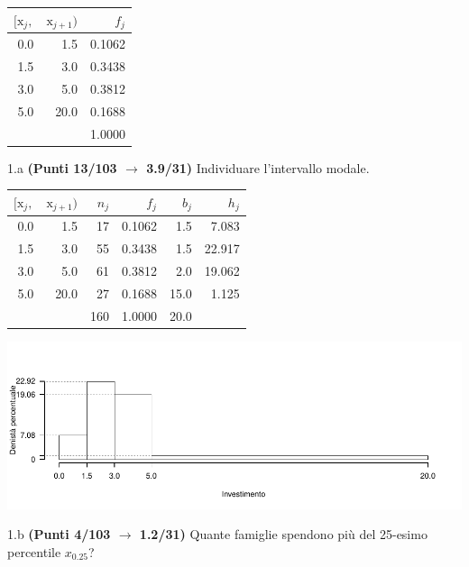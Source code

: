 \documentclass[
  11pt,
]{book}
\theoremstyle{mytheoremstyle}
\theoremstyle{mydefstyle}
\newenvironment{sol}
  {
  \begin{tcolorbox}[enhanced,breakable,arc=0.1mm,boxrule=1pt,colback=white,colframe=iblue,
  title=\bf \fontfamily{lmss}\selectfont \hspace{.5 cm} Soluzione,drop fuzzy shadow]

}{
\end{tcolorbox}
  }
\begin{document}
\begin{table}[H]
\centering
\begin{tabular}{rrr}
\toprule
$[\text{x}_j,$ & $\text{x}_{j+1})$ & $f_j$\\
\midrule
0.0 & 1.5 & 0.1062\\
1.5 & 3.0 & 0.3438\\
3.0 & 5.0 & 0.3812\\
5.0 & 20.0 & 0.1688\\
 &  & 1.0000\\
\bottomrule
\end{tabular}
\end{table}

1.a \textbf{(Punti 13/103 \(\rightarrow\) 3.9/31)} Individuare l'intervallo modale.

\begin{sol}

\begin{table}[H]
\centering
\begin{tabular}{rrrrrr}
\toprule
$[\text{x}_j,$ & $\text{x}_{j+1})$ & $n_j$ & $f_j$ & $b_j$ & $h_j$\\
\midrule
0.0 & 1.5 & 17 & 0.1062 & 1.5 & 7.083\\
1.5 & 3.0 & 55 & 0.3438 & 1.5 & 22.917\\
3.0 & 5.0 & 61 & 0.3812 & 2.0 & 19.062\\
5.0 & 20.0 & 27 & 0.1688 & 15.0 & 1.125\\
 &  & 160 & 1.0000 & 20.0 & \\
\bottomrule
\end{tabular}
\end{table}

\begin{center}\includegraphics{Esami_passati_con_soluzioni_files/figure-latex/2024-85-1} \end{center}

\end{sol}

1.b \textbf{(Punti 4/103 \(\rightarrow\) 1.2/31)} Quante famiglie spendono più del 25-esimo percentile \(x_{0.25}\)?
\end{document}
